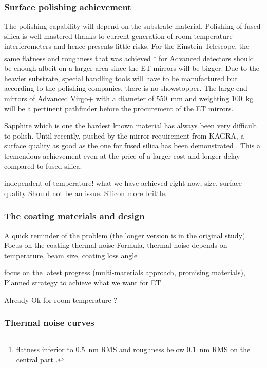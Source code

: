 \subsubsection{Surface polishing achievement}

The polishing capability will depend on the substrate material. Polishing of fused silica is well mastered thanks to current generation of room temperature interferometers and hence presents little risks. For the Einstein Telescope, the same flatness and roughness that was achieved \footnote{flatness inferior to 0.5~nm RMS and roughness below 0.1~nm RMS on the central part \cite{pinard2017mirrors}.} for Advanced detectors should be enough albeit on a larger area since the ET mirrors will be bigger. Due to the heavier substrate, special handling tools will have to be manufactured but according to the polishing companies, there is no showstopper. The large end mirrors of Advanced Virgo+ with a diameter of 550~mm and weighting 100~kg will be a pertinent pathfinder before the procurement of the ET mirrors.

Sapphire which is one the hardest known material has always been very difficult to polish. Until recently, pushed by the mirror requirement from KAGRA, a surface quality as good as the one for fused silica has been demonstrated \cite{hirose2014sapphire}. This a tremendous achievement even at the price of a larger cost and longer delay compared to fused silica.


independent of temperature! what we have achieved right now, size, surface quality
Should not be an issue.
Silicon more brittle.

\subsubsection{The coating materials and design}

A quick reminder of the problem (the longer version is in the original study). Focus on the coating thermal noise
Formula, thermal noise depends on temperature, beam size, coating loss angle

focus on the latest progress (multi-materials approach, promising materials),
Planned strategy to achieve what we want for ET

Already Ok for room temperature ?

\subsubsection{Thermal noise curves}

